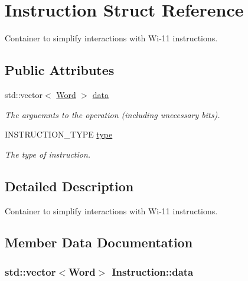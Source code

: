 \hypertarget{structInstruction}{
\section{Instruction Struct Reference}
\label{structInstruction}
}


Container to simplify interactions with Wi-\/11 instructions.  


\subsection*{Public Attributes}
\begin{DoxyCompactItemize}
\item 
std::vector$<$ \hyperlink{classWord}{Word} $>$ \hyperlink{structInstruction_a93f6b7366b14b17d8379ea952687960c}{data}
\begin{DoxyCompactList}\small\item\em The arguemnts to the operation (including unecessary bits). \item\end{DoxyCompactList}\item 
\hypertarget{structInstruction_afc9f26527635d9d851759eab142e5ec7}{
INSTRUCTION\_\-TYPE \hyperlink{structInstruction_afc9f26527635d9d851759eab142e5ec7}{type}}
\label{structInstruction_afc9f26527635d9d851759eab142e5ec7}

\begin{DoxyCompactList}\small\item\em The type of instruction. \item\end{DoxyCompactList}\end{DoxyCompactItemize}


\subsection{Detailed Description}
Container to simplify interactions with Wi-\/11 instructions. 

\subsection{Member Data Documentation}
\hypertarget{structInstruction_a93f6b7366b14b17d8379ea952687960c}{
\subsubsection[{data}]{\setlength{\rightskip}{0pt plus 5cm}std::vector$<${\bf Word}$>$ {\bf Instruction::data}}}
\label{structInstruction_a93f6b7366b14b17d8379ea952687960c}


